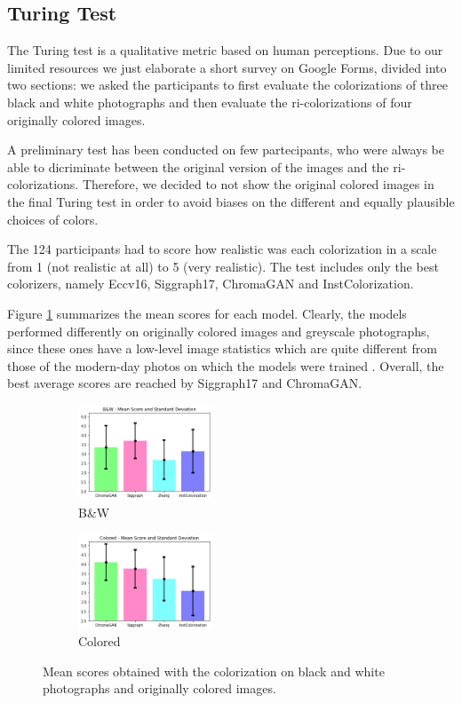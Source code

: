 \subsection{Turing Test}
The Turing test is a qualitative metric based on human perceptions. Due to our limited resources we just elaborate a short survey on Google Forms, divided into two sections: we asked the participants to first evaluate the colorizations of three black and white photographs and then evaluate the ri-colorizations of four originally colored images. 

A preliminary test has been conducted on few partecipants, who were always be able to dicriminate between the original version of the images and the ri-colorizations. Therefore, we decided to not show the original colored images in the final Turing test in order to avoid biases on the different and equally plausible choices of colors. 

The 124 participants had to score how realistic was each colorization in a
scale from 1 (not realistic at all) to 5 (very realistic). The test includes only the best colorizers, namely Eccv16, Siggraph17, ChromaGAN and InstColorization. 

Figure \ref{fig:turing} summarizes the mean scores for each model. Clearly, the models performed differently on originally colored images and greyscale photographs, since these ones have a low-level image statistics which are quite different from those of the modern-day photos on which the models were trained \cite{zhang}.
Overall, the best average scores are reached by Siggraph17 and ChromaGAN.

\begin{figure}[h]
	\centering
	\captionsetup[subfigure]{labelformat=empty}
	\begin{subfigure}[b]{0.1\textwidth}
		\begin{adjustwidth}{-1.1cm}{}
		\includegraphics[width=4cm]{bw turing.png}
		\end{adjustwidth}
	\caption{B\&W}
	\end{subfigure}
\hspace{2.3cm}
	\begin{subfigure}[b]{0.1\textwidth}
		\begin{adjustwidth}{-1.1cm}{}
			\includegraphics[width=4cm]{col turing.png}
		\end{adjustwidth}
		\caption{Colored}
	\end{subfigure}
	\caption{{\small Mean scores obtained with the colorization on black and white photographs and originally colored images.}}
	\label{fig:turing}
\end{figure}